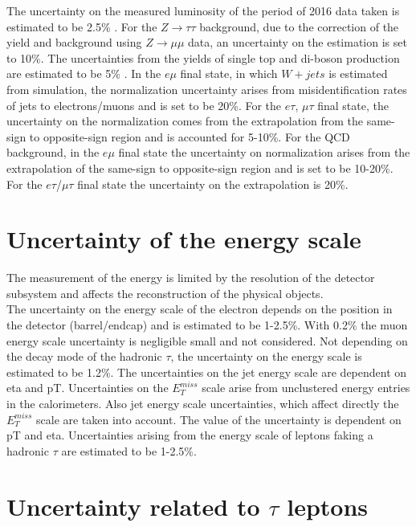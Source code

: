 The uncertainty on the measured luminosity of the period of 2016 data taken is estimated to be 2.5\% \cite{LUMI}. For the $Z\to\tau\tau$ background, due to the correction of the yield and background using $Z\to \mu\mu$ data, an uncertainty on the estimation is set to 10\%. The uncertainties from the yields of single top and di-boson production are estimated to be 5\% \cite{singleT} \cite{VV}. In the $e\mu$ final state, in which $W +jets$ is estimated from simulation, the normalization uncertainty arises from misidentification rates of jets to electrons/muons and is set to be 20\%. For the $e\tau$, $\mu\tau$ final state, the uncertainty on the normalization comes from the extrapolation from the same-sign to opposite-sign region and is accounted for 5-10\%. For the \gls{QCD} background, in the $e\mu$ final state the uncertainty on normalization arises from the extrapolation of the same-sign to opposite-sign region and is set to be 10-20\%. For the $e\tau$/$\mu\tau$ final state the uncertainty on the extrapolation is 20\%. 

\section{Uncertainty of the energy scale}

The measurement of the energy is limited by the resolution of the detector subsystem and affects the reconstruction of the physical objects. \\

The uncertainty on the energy scale of the electron depends on the position in the detector (barrel/endcap) and is estimated to be 1-2.5\%. With 0.2\% the muon energy scale uncertainty is negligible small and not considered. Not depending on the decay mode of the hadronic $\tau$, the uncertainty on the energy scale is estimated to be 1.2\%. The uncertainties on the jet energy scale are dependent on \gls{eta} and \gls{pT}. Uncertainties on the $E_T^{miss}$ scale \cite{METRECO} arise from unclustered energy entries in the calorimeters. Also jet energy scale uncertainties, which affect directly the $E_T^{miss}$ scale are taken into account. The value of the uncertainty is dependent on \gls{pT} and \gls{eta}. Uncertainties arising from the energy scale of leptons faking a hadronic $\tau$ are estimated to be 1-2.5\%.

\section{Uncertainty related to $\tau$ leptons}

